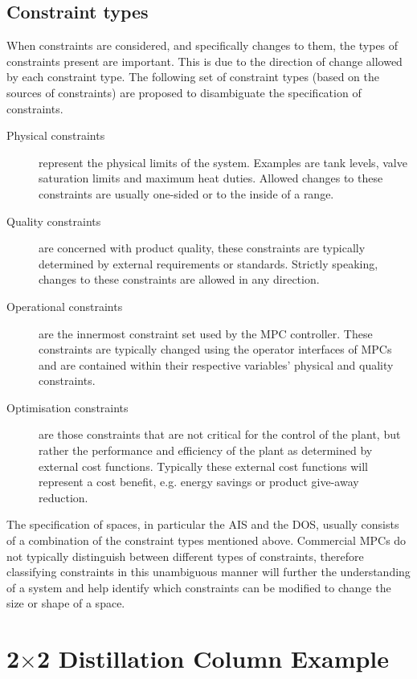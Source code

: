 \documentclass[final,authoryear,5pt,times,twocolumn]{elsarticle}
\begin{document}
\subsection{Constraint types}\label{sec:contypes}
When constraints are considered, and specifically changes to them, the types of constraints present are important.
This is due to the direction of change allowed by each constraint type.
The following set of constraint types (based on the sources of constraints) are proposed to disambiguate the specification of constraints.
\begin{description}
  \item [Physical constraints] represent the physical limits of the system.
  Examples are tank levels, valve saturation limits and maximum heat duties.
  Allowed changes to these constraints are usually one-sided or to the inside of a range.
  \item [Quality constraints] are concerned with product quality, these constraints are typically determined by external requirements or standards.
  Strictly speaking, changes to these constraints are allowed in any direction.
  \item [Operational constraints] are the innermost constraint set used by the MPC controller.
  These constraints are typically changed using the operator interfaces of MPCs and are contained within their respective variables' physical and quality constraints.
  \item [Optimisation constraints] are those constraints that are not critical for the control of the plant, but rather the performance and efficiency of the plant as determined by external cost functions.
  Typically these external cost functions will represent a cost benefit, e.g. energy savings or product give-away reduction.
\end{description}

The specification of spaces, in particular the AIS and the DOS, usually consists of a combination of the constraint types mentioned above.
Commercial MPCs do not typically distinguish between different types of constraints, therefore classifying constraints in this unambiguous manner will further the understanding of a system and help identify which constraints can be modified to change the size or shape of a space.


\section{2$\times$2 Distillation Column Example}\label{sec:dist}
\end{document}
